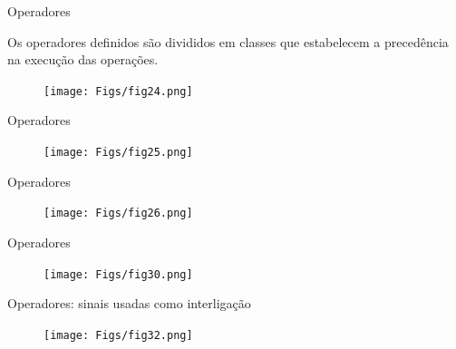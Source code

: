 \documentclass[aspectratio=169]{beamer}
\begin{document}

\begin{frame}{Operadores}
	\justifying
	
	\begin{block}{}
		\justifying
		Os operadores definidos são divididos em classes que estabelecem a precedência na execução das operações.
	\end{block}		
	
	\begin{figure}[h]
		\centering
		\texttt{[image: Figs/fig24.png]}
	\end{figure}
	
	
\end{frame}
\begin{frame}{Operadores}
	\justifying
	
	
	\begin{figure}[h]
		\centering
		\texttt{[image: Figs/fig25.png]}
	\end{figure}
	
	
\end{frame}
\begin{frame}{Operadores}
	\justifying
	
	
	\begin{figure}[h]
		\centering
		\texttt{[image: Figs/fig26.png]}
	\end{figure}
	
	
\end{frame}
\begin{frame}{Operadores}
	\justifying
	
	
	\begin{figure}[h]
		\centering
		\texttt{[image: Figs/fig30.png]}
	\end{figure}
	
	
\end{frame}
\begin{frame}{Operadores: sinais usadas como interligação}
	\justifying
	
	
	\begin{figure}[h]
		\centering
		\texttt{[image: Figs/fig32.png]}
	\end{figure}
	
	
\end{frame}
\end{document}
